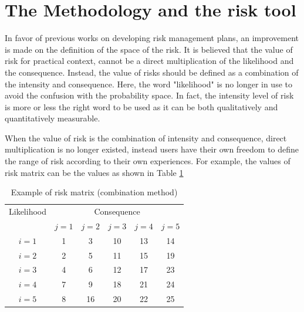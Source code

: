 \documentclass[10pt,halfline,a4paper]{ouparticle}
\begin{document}
\section{The Methodology and the risk tool}
\label{sec3}
In favor of previous works on developing risk management plans, an improvement is made on the definition of the space of the risk. It is believed that the value of risk for practical context, cannot be a direct multiplication of the likelihood and the consequence. Instead, the value of risks should be defined as a combination of the intensity and consequence. Here, the word "likelihood" is no longer in use to avoid the confusion with the probability space. In fact, the intensity level of risk is more or less the right word to be used as it can be both qualitatively and quantitatively measurable. 

When the value of risk is the combination of intensity and consequence, direct multiplication is no longer existed, instead users have their own freedom to define the range of risk according to their own experiences. For example, the values of risk matrix can be the values as shown in Table \ref{tbl_riskmatrix2}

\begin{table}
\centering
\caption{Example of risk matrix (combination method)} 
\begin{tabular}{l|l|l|l|l|l}
\hline
\multicolumn{1}{c|}{Likelihood} & \multicolumn{5}{c}{Consequence} \\ 
\cline{2-6}
\multicolumn{1}{c|}{} & \multicolumn{1}{c|}{$j=1$} & \multicolumn{1}{c|}{$j=2$} & \multicolumn{1}{c|}{$j=3$} & \multicolumn{1}{c|}{$j=4$} & \multicolumn{1}{c}{$j=5$} \\ 
\hline
\multicolumn{1}{c|}{$i=1$} & \multicolumn{1}{c|}{1} & \multicolumn{1}{c|}{3} & \multicolumn{1}{c|}{10} & \multicolumn{1}{c|}{13} & \multicolumn{1}{c}{14} \\ 
\multicolumn{1}{c|}{$i=2$} & \multicolumn{1}{c|}{2} & \multicolumn{1}{c|}{5} & \multicolumn{1}{c|}{11} & \multicolumn{1}{c|}{15} & \multicolumn{1}{c}{19} \\ 
\multicolumn{1}{c|}{$i=3$} & \multicolumn{1}{c|}{4} & \multicolumn{1}{c|}{6} & \multicolumn{1}{c|}{12} & \multicolumn{1}{c|}{17} & \multicolumn{1}{c}{23} \\ 
\multicolumn{1}{c|}{$i=4$} & \multicolumn{1}{c|}{7} & \multicolumn{1}{c|}{9} & \multicolumn{1}{c|}{18} & \multicolumn{1}{c|}{21} & \multicolumn{1}{c}{24} \\ 
\multicolumn{1}{c|}{$i=5$} & \multicolumn{1}{c|}{8} & \multicolumn{1}{c|}{16} & \multicolumn{1}{c|}{20} & \multicolumn{1}{c|}{22} & \multicolumn{1}{c}{25} \\ 
\hline
\end{tabular}
\label{tbl_riskmatrix2}
\end{table}
\end{document}
